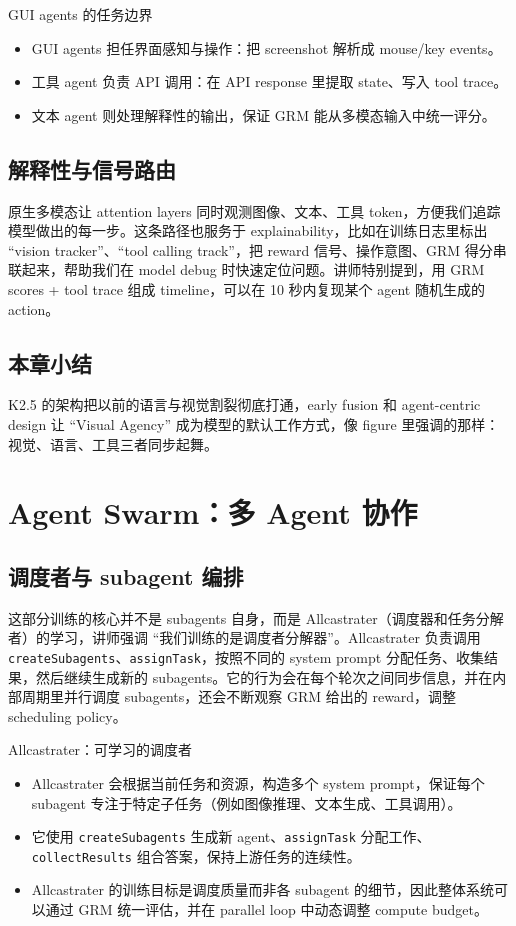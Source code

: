 \documentclass[a4paper]{article}
\begin{document}
\begin{knowledgebox}{GUI agents 的任务边界}
\begin{itemize}
    \item GUI agents 担任界面感知与操作：把 screenshot 解析成 mouse/key events。
    \item 工具 agent 负责 API 调用：在 API response 里提取 state、写入 tool trace。
    \item 文本 agent 则处理解释性的输出，保证 GRM 能从多模态输入中统一评分。
\end{itemize}
\end{knowledgebox}

\subsection{解释性与信号路由}
原生多模态让 attention layers 同时观测图像、文本、工具 token，方便我们追踪模型做出的每一步。这条路径也服务于 explainability，比如在训练日志里标出 ``vision tracker''、``tool calling track''，把 reward 信号、操作意图、GRM 得分串联起来，帮助我们在 model debug 时快速定位问题。讲师特别提到，用 GRM scores + tool trace 组成 timeline，可以在 10 秒内复现某个 agent 随机生成的 action。

\subsection{本章小结}
K2.5 的架构把以前的语言与视觉割裂彻底打通，early fusion 和 agent-centric design 让 ``Visual Agency'' 成为模型的默认工作方式，像 figure 里强调的那样：视觉、语言、工具三者同步起舞。
\section{Agent Swarm：多 Agent 协作}

\subsection{调度者与 subagent 编排}
这部分训练的核心并不是 subagents 自身，而是 Allcastrater（调度器和任务分解者）的学习，讲师强调 ``我们训练的是调度者分解器''。Allcastrater 负责调用 \texttt{createSubagents}、\texttt{assignTask}，按照不同的 system prompt 分配任务、收集结果，然后继续生成新的 subagents。它的行为会在每个轮次之间同步信息，并在内部周期里并行调度 subagents，还会不断观察 GRM 给出的 reward，调整 scheduling policy。

\begin{knowledgebox}{Allcastrater：可学习的调度者}
\begin{itemize}
    \item Allcastrater 会根据当前任务和资源，构造多个 system prompt，保证每个 subagent 专注于特定子任务（例如图像推理、文本生成、工具调用）。
    \item 它使用 \texttt{createSubagents} 生成新 agent、\texttt{assignTask} 分配工作、\texttt{collectResults} 组合答案，保持上游任务的连续性。
    \item Allcastrater 的训练目标是调度质量而非各 subagent 的细节，因此整体系统可以通过 GRM 统一评估，并在 parallel loop 中动态调整 compute budget。
\end{itemize}
\end{knowledgebox}
\end{document}
